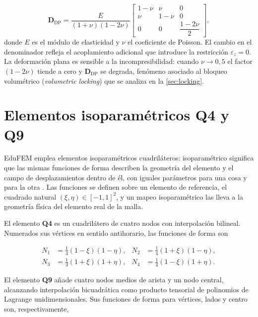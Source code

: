 \begin{equation}
\bm{D}_{\text{DP}} = \frac{E}{(1+\nu)(1-2\nu)}
\begin{bmatrix}
1-\nu & \nu & 0 \\
\nu & 1-\nu & 0 \\
0 & 0 & \dfrac{1-2\nu}{2}
\end{bmatrix},
\label{eq:D-deformacion-plana}
\end{equation}
donde $E$ es el módulo de elasticidad y $\nu$ el coeficiente de Poisson. El cambio en el denominador refleja el acoplamiento adicional que introduce la restricción $\varepsilon_z = 0$. La deformación plana es sensible a la incompresibilidad: cuando $\nu \to 0{,}5$ el factor $(1-2\nu)$ tiende a cero y $\bm{D}_{\text{DP}}$ se degrada, fenómeno asociado al bloqueo volumétrico (\emph{volumetric locking}) que se analiza en la \autoref{sec:locking}.

\section{Elementos isoparamétricos Q4 y Q9}
\label{sec:isoparametricos}

EduFEM emplea elementos isoparamétricos cuadriláteros: isoparamétrico significa que las mismas funciones de forma describen la geometría del elemento y el campo de desplazamientos dentro de él, con iguales parámetros para una cosa y para la otra \autocites[p.~339]{bathe2014fem}[p.~187]{onate2009structural}. Las funciones se definen sobre un elemento de referencia, el cuadrado natural $(\xi, \eta) \in [-1, 1]^2$, y un mapeo isoparamétrico las lleva a la geometría física del elemento real de la malla.

El elemento \textbf{Q4} es un cuadrilátero de cuatro nodos con interpolación bilineal. Numerados sus vértices en sentido antihorario, las funciones de forma son

\begin{equation}
\begin{aligned}
N_1 &= \tfrac{1}{4}(1-\xi)(1-\eta), & N_2 &= \tfrac{1}{4}(1+\xi)(1-\eta), \\
N_3 &= \tfrac{1}{4}(1+\xi)(1+\eta), & N_4 &= \tfrac{1}{4}(1-\xi)(1+\eta).
\end{aligned}
\label{eq:N-q4}
\end{equation}

El elemento \textbf{Q9} añade cuatro nodos medios de arista y un nodo central, alcanzando interpolación bicuadrática como producto tensorial de polinomios de Lagrange unidimensionales. Sus funciones de forma para vértices, lados y centro son, respectivamente,

